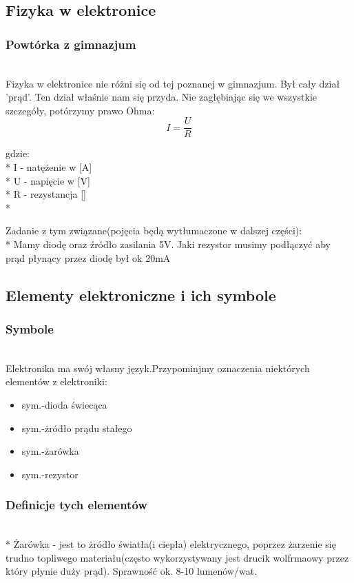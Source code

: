  \subsection{Fizyka w elektronice}
	\subsubsection{Powtórka z gimnazjum}
	\\Fizyka w elektronice nie różni się od tej poznanej w gimnazjum. Był cały dział 'prąd'. Ten dział właśnie nam się przyda. Nie zagłębiając się we wszystkie szczegóły, potórzymy prawo Ohma:
	\[I=\frac{U}{R}\]

	gdzie:\\*
	I - natężenie w [A] \\*
	U - napięcie w [V] \\*
	R - rezystancja [\Omega] \\*			

Zadanie z tym związane(pojęcia będą wytłumaczone w dalszej części): \\* Mamy diodę oraz źródło zasilania 5V. Jaki rezystor musimy podłączyć aby prąd płynący przez diodę był ok 20mA %
	\subsection{Elementy elektroniczne i ich symbole}
	\subsubsection {Symbole}
	\\Elektronika ma swój własny język.Przypominjmy oznaczenia niektórych elementów z elektroniki:
\begin{itemize}
	\item sym.-dioda świecąca
	\item sym.-żródło prądu stałego
	\item sym.-żarówka
	\item sym.-rezystor
\end{itemize}

   \subsubsection{Definicje tych elementów}
\\* Żarówka - jest to żródło światła(i ciepła) elektrycznego, poprzez żarzenie się trudno topliwego materiału(często wykorzystywany jest drucik wolfrmaowy przez który płynie duży prąd). Sprawność ok.
8-10 lumenów/wat. 

